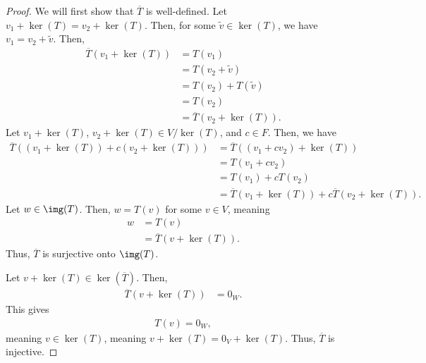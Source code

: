 \documentclass[10pt]{mypackage}
\begin{document}
\begin{proof}
  We will first show that $\overline{T}$ is well-defined. Let $v_1 + \ker(T) = v_2 + \ker(T)$. Then, for some $\tilde{v}\in \ker(T)$, we have $v_1 = v_2 + \tilde{v}$. Then,
  \begin{align*}
    \overline{T}\left(v_1 + \ker(T)\right) &= T\left(v_1\right)\\
                                           &= T\left(v_2 + \tilde{v}\right)\\
                                           &= T\left(v_2\right) + T\left(\tilde{v}\right)\\
                                           &= T\left(v_2\right)\\
                                           &= \overline{T}\left(v_2 + \ker(T)\right).
  \end{align*}
  Let $v_1 + \ker(T)$, $v_2 + \ker(T)\in V/\ker(T)$, and $c\in F$. Then, we have
  \begin{align*}
    \overline{T}\left(\left(v_1 + \ker(T)\right) + c\left(v_2 + \ker(T)\right)\right) &= \overline{T}\left(\left(v_1 + cv_2\right) + \ker(T)\right)\\
                                                                                      &= T\left(v_1 + cv_2\right)\\
                                                                                      &= T\left(v_1\right) + cT\left(v_2\right)\\
                                                                                      &= \overline{T}\left(v_1 + \ker(T)\right) + c\overline{T}\left(v_2 + \ker(T)\right).
  \end{align*}
  Let $w\in \img(T)$. Then, $w = T(v)$ for some $v\in V$, meaning
  \begin{align*}
    w &= T\left(v\right)\\
    &= \overline{T} \left(v + \ker(T)\right).
  \end{align*}
  Thus, $\overline{T}$ is surjective onto $\img(T)$.\newline

  Let $v + \ker(T)\in \ker\left(\overline{T}\right)$. Then,
  \begin{align*}
    \overline{T}\left(v + \ker(T)\right) &= 0_W.
  \end{align*}
  This gives
  \begin{align*}
    T\left(v\right) = 0_W,
  \end{align*}
  meaning $v\in \ker(T)$, meaning $v + \ker(T) = 0_V + \ker(T)$. Thus, $\overline{T}$ is injective.
\end{proof}
\end{document}

